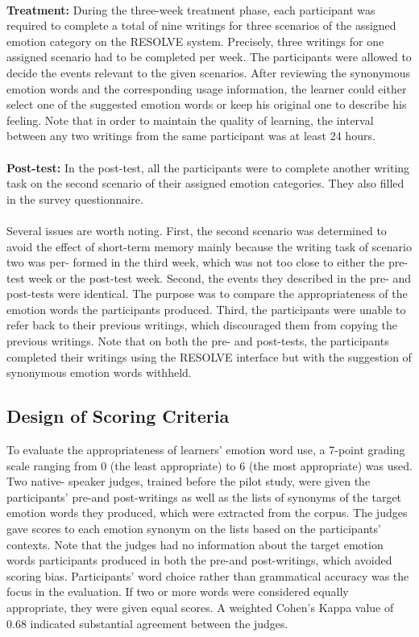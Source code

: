 \documentclass[a4paper,12pt,oneside]{article}
\begin{document}
\paragraph{}
\textbf{Treatment:} During the three-week treatment phase, each participant was required to complete a total of nine writings for three scenarios of the assigned emotion category on the RESOLVE system. Precisely, three writings for one assigned scenario had to be completed per week. The participants were allowed to decide the events relevant to the given scenarios. After reviewing the synonymous emotion words and the corresponding usage information, the learner could either select one of the suggested emotion words or keep his original one to describe his feeling. Note that in order to maintain the quality of learning, the interval between any two writings from the same participant was at least 24 hours. 
\paragraph{}
\textbf{Post-test:} In the post-test, all the participants were to complete another writing task on the second scenario of their assigned emotion categories. They also filled in the survey questionnaire. 
\paragraph{}
Several issues are worth noting. First, the second scenario was determined to avoid the effect of short-term memory mainly because the writing task of scenario two was per- formed in the third week, which was not too close to either the pre-test week or the post-test week. Second, the events they described in the pre- and post-tests were identical. The purpose was to compare the appropriateness of the emotion words the participants produced. Third, the participants were unable to refer back to their previous writings, which discouraged them from copying the previous writings. Note that on both the pre- and post-tests, the participants completed their writings using the RESOLVE interface but with the suggestion of synonymous emotion words withheld. 
\subsection{Design of Scoring Criteria}
To evaluate the appropriateness of learners’ emotion word use, a 7-point grading scale ranging from 0 (the least appropriate) to 6 (the most appropriate) was used. Two native- speaker judges, trained before the pilot study, were given the participants’ pre-and post-writings as well as the lists of synonyms of the target emotion words they produced, which were extracted from the corpus. The judges gave scores to each emotion synonym on the lists based on the participants’ contexts. Note that the judges had no information about the target emotion words participants produced in both the pre-and post-writings, which avoided scoring bias. Participants’ word choice rather than grammatical accuracy was the focus in the evaluation. If two or more words were considered equally appropriate, they were given equal scores. A weighted Cohen’s Kappa value of 0.68 indicated substantial agreement between the judges. 
\end{document}
